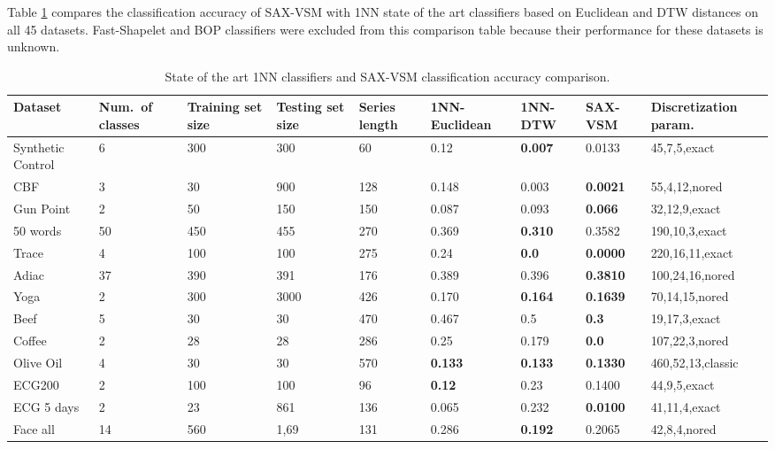 Table \ref{perf_table2} compares the classification accuracy of SAX-VSM with 
1NN state of the art classifiers based on Euclidean and DTW distances on all 45 datasets. 
Fast-Shapelet and BOP classifiers were excluded from this comparison table because their 
performance for these datasets is unknown.

\clearpage

\begin{table}[t!]
\caption{State of the art 1NN classifiers and SAX-VSM classification accuracy comparison.}
 \label{perf_table2}
\centering
{\setlength{\extrarowheight}{1pt}%
{\scriptsize
\begin{tabularx}{\linewidth}{@{} l *7X @{} l}
\hline
Dataset & \mbox{Num. of} classes & Training set size & Testing set size & Series length & 1NN-Euclidean & 1NN-DTW & SAX-VSM & Discretization param. \\
\hline
Synthetic Control & 6 & 300 & 300 & 60 & 0.12 & \textbf{0.007} & 0.0133 & 45,7,5,exact \\
CBF & 3 & 30 & 900 & 128 & 0.148 & 0.003 & \textbf{0.0021} & 55,4,12,nored \\
Gun Point & 2 & 50 & 150 & 150 & 0.087 & 0.093 & \textbf{0.066} & 32,12,9,exact \\
50 words & 50 & 450 & 455 & 270 & 0.369 & \textbf{0.310} & 0.3582 & 190,10,3,exact \\ 
Trace & 4 & 100 & 100 & 275 & 0.24 & \textbf{0.0} & \textbf{0.0000} & 220,16,11,exact \\
Adiac & 37 & 390 & 391 & 176 & 0.389 & 0.396 & \textbf{0.3810} & 100,24,16,nored \\
Yoga & 2 & 300 & 3000 & 426 & 0.170 & \textbf{0.164} & \textbf{0.1639} & 70,14,15,nored \\ 
Beef & 5 & 30 & 30 & 470 & 0.467 & 0.5 & \textbf{0.3} & 19,17,3,exact \\ 
Coffee & 2 & 28 & 28 & 286 & 0.25 & 0.179 & \textbf{0.0} & 107,22,3,nored \\
Olive Oil & 4 & 30 & 30 & 570 & \textbf{0.133} & \textbf{0.133} & \textbf{0.1330} & 460,52,13,classic \\
ECG200 & 2 & 100 & 100 & 96 & \textbf{0.12} & 0.23 & 0.1400 & 44,9,5,exact \\
ECG 5 days & 2 & 23 & 861 & 136 & 0.065 & 0.232 & \textbf{0.0100} & 41,11,4,exact \\
Face all & 14 & 560 & 1,69 & 131 & 0.286 & \textbf{0.192} & 0.2065 & 42,8,4,nored \\

\end{tabularx}}}
\end{table}
